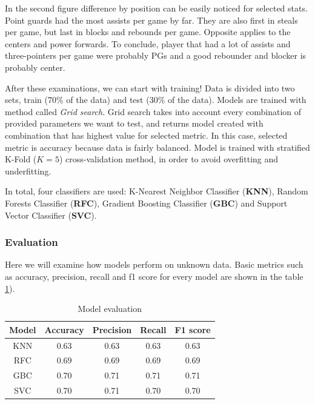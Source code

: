 \documentclass[a4paper]{article}
\begin{document}
In the second figure difference by position can be easily noticed for selected stats. Point guards had the most assists per game by far. They are also first in steals per game, but last in blocks and rebounds per game. Opposite applies to the centers and power forwards. To conclude, player that had a lot of assists and three-pointers per game were probably PGs and a good rebounder and blocker is probably center.

After these examinations, we can start with training! Data is divided into two sets, train (70\% of the data) and test (30\% of the data). Models are trained with method called \textit{Grid search}. Grid search takes into account every combination of provided parameters we want to test, and returns model created with combination that has highest value for selected metric. In this case, selected metric is accuracy because data is fairly balanced. Model is trained with stratified K-Fold ($K = 5$) cross-validation method, in order to avoid overfitting and underfitting.

In total, four classifiers are used: K-Nearest Neighbor Classifier (\textbf{KNN}), Random Forests Classifier (\textbf{RFC}), Gradient Boosting Classifier (\textbf{GBC}) and Support Vector Classifier (\textbf{SVC}).

\subsubsection{Evaluation}
\label{subsubsec:pos_clf_eval}

Here we will examine how models perform on unknown data. Basic metrics such as accuracy, precision, recall and f1 score for every model are shown in the table \ref{tab:pos_clf_models}).

\begin{table}[!h]
\begin{center}
\begin{tabular}{|c|c|c|c|c|} \hline
Model & Accuracy & Precision & Recall & F1 score \\ \hline
KNN & 0.63 & 0.63 & 0.63 & 0.63 \\ \hline
RFC & 0.69 & 0.69 & 0.69 & 0.69 \\ \hline
GBC & 0.70 & 0.71 & 0.71 & 0.71 \\ \hline
SVC & 0.70 & 0.71 & 0.70 & 0.70 \\ \hline
\end{tabular}
\caption{Model evaluation}
\label{tab:pos_clf_models}
\end{center}
\end{table}
\end{document}
